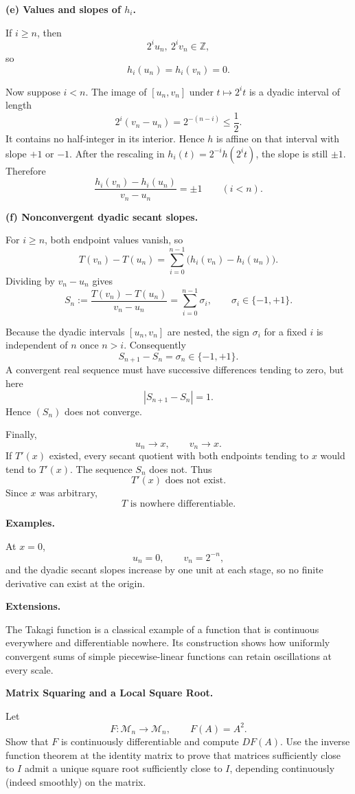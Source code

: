 \begin{solution}
\par\smallskip\noindent\textbf{(e) Values and slopes of \(h_i\).}

If \(i\ge n\), then
\[
2^iu_n,\ 2^iv_n\in\mathbb Z,
\]
so
\[
h_i(u_n)=h_i(v_n)=0.
\]

Now suppose \(i<n\). The image of \([u_n,v_n]\) under
\(t\mapsto2^it\) is a dyadic interval of length
\[
2^i(v_n-u_n)
=
2^{-(n-i)}
\le
\frac12.
\]
It contains no half-integer in its interior. Hence \(h\) is affine on
that interval with slope \(+1\) or \(-1\). After the rescaling in
\(h_i(t)=2^{-i}h(2^it)\), the slope is still \(\pm1\). Therefore
\[
\boxed{
\frac{h_i(v_n)-h_i(u_n)}{v_n-u_n}
=
\pm1
\qquad(i<n).}
\]

\par\smallskip\noindent\textbf{(f) Nonconvergent dyadic secant slopes.}

For \(i\ge n\), both endpoint values vanish, so
\[
T(v_n)-T(u_n)
=
\sum_{i=0}^{n-1}
\bigl(h_i(v_n)-h_i(u_n)\bigr).
\]
Dividing by \(v_n-u_n\) gives
\[
S_n
:=
\frac{T(v_n)-T(u_n)}{v_n-u_n}
=
\sum_{i=0}^{n-1}\sigma_i,
\qquad
\sigma_i\in\{-1,+1\}.
\]

Because the dyadic intervals \([u_n,v_n]\) are nested, the sign
\(\sigma_i\) for a fixed \(i\) is independent of \(n\) once \(n>i\).
Consequently
\[
S_{n+1}-S_n
=
\sigma_n
\in\{-1,+1\}.
\]
A convergent real sequence must have successive differences tending to
zero, but here
\[
|S_{n+1}-S_n|=1.
\]
Hence \((S_n)\) does not converge.

Finally,
\[
u_n\to x,
\qquad
v_n\to x.
\]
If \(T'(x)\) existed, every secant quotient with both endpoints tending
to \(x\) would tend to \(T'(x)\). The sequence \(S_n\) does not. Thus
\[
\boxed{T'(x)\text{ does not exist}.}
\]
Since \(x\) was arbitrary,
\[
\boxed{T\text{ is nowhere differentiable}.}
\]

\medskip
\noindent\textbf{Examples.}

At \(x=0\),
\[
u_n=0,
\qquad
v_n=2^{-n},
\]
and the dyadic secant slopes increase by one unit at each stage, so no
finite derivative can exist at the origin.

\medskip
\noindent\textbf{Extensions.}

The Takagi function is a classical example of a function that is
continuous everywhere and differentiable nowhere. Its construction
shows how uniformly convergent sums of simple piecewise-linear functions
can retain oscillations at every scale.
\end{solution}

\begin{problem}[CP-II-0132]
\label{prob:cp-ii-0132}
\textbf{Matrix Squaring and a Local Square Root.}

\hspace*{1.5em}Let
\[
F:\mathcal M_n\to\mathcal M_n,
\qquad
F(A)=A^2.
\]
Show that \(F\) is continuously differentiable and compute \(DF(A)\).
Use the inverse function theorem at the identity matrix to prove that matrices
sufficiently close to \(I\) admit a unique square root sufficiently close to
\(I\), depending continuously (indeed smoothly) on the matrix.
\end{problem}


